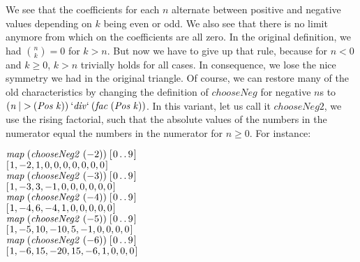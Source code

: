 \documentclass[tikz]{scrreprt}
\newcommand{\Conid}[1]{\mathit{#1}}
\newcommand{\Varid}[1]{\mathit{#1}}
\begin{document}
We see that the coefficients for each $n$
alternate between positive and negative values
depending on $k$ being even or odd.
We also see that there is no limit anymore
from which on the coefficients are all zero.
In the original definition,
we had $\binom{n}{k}=0$ for $k>n$.
But now we have to give up that rule,
because for $n<0$ and $k\ge 0$,
$k>n$ trivially holds for all cases.
In consequence, we lose the nice symmetry
we had in the original triangle.
Of course, we can restore many of the old
characteristics by changing the definition
of \ensuremath{\Varid{chooseNeg}} for negative $n$s to
\ensuremath{(\Varid{n}\mathbin{|>}(\Conid{Pos}\;\Varid{k}))\mathbin{\Varid{`div`}}(\Varid{fac}\;(\Conid{Pos}\;\Varid{k}))}.
In this variant, let us call it \ensuremath{\Varid{chooseNeg2}},
we use the rising factorial,
such that the absolute values of the numbers 
in the numerator equal the numbers in the numerator
for $n\ge 0$.
For instance:

\ensuremath{\Varid{map}\;(\Varid{chooseNeg2}\;(\mathbin{-}\mathrm{2}))\;[\mskip1.5mu \mathrm{0}\mathinner{\ldotp\ldotp}\mathrm{9}\mskip1.5mu]}\\
\ensuremath{[\mskip1.5mu \mathrm{1},\mathbin{-}\mathrm{2},\mathrm{1},\mathrm{0},\mathrm{0},\mathrm{0},\mathrm{0},\mathrm{0},\mathrm{0},\mathrm{0}\mskip1.5mu]}\\[12pt]
\ensuremath{\Varid{map}\;(\Varid{chooseNeg2}\;(\mathbin{-}\mathrm{3}))\;[\mskip1.5mu \mathrm{0}\mathinner{\ldotp\ldotp}\mathrm{9}\mskip1.5mu]}\\
\ensuremath{[\mskip1.5mu \mathrm{1},\mathbin{-}\mathrm{3},\mathrm{3},\mathbin{-}\mathrm{1},\mathrm{0},\mathrm{0},\mathrm{0},\mathrm{0},\mathrm{0},\mathrm{0}\mskip1.5mu]}\\[12pt]
\ensuremath{\Varid{map}\;(\Varid{chooseNeg2}\;(\mathbin{-}\mathrm{4}))\;[\mskip1.5mu \mathrm{0}\mathinner{\ldotp\ldotp}\mathrm{9}\mskip1.5mu]}\\
\ensuremath{[\mskip1.5mu \mathrm{1},\mathbin{-}\mathrm{4},\mathrm{6},\mathbin{-}\mathrm{4},\mathrm{1},\mathrm{0},\mathrm{0},\mathrm{0},\mathrm{0},\mathrm{0}\mskip1.5mu]}\\[12pt]
\ensuremath{\Varid{map}\;(\Varid{chooseNeg2}\;(\mathbin{-}\mathrm{5}))\;[\mskip1.5mu \mathrm{0}\mathinner{\ldotp\ldotp}\mathrm{9}\mskip1.5mu]}\\
\ensuremath{[\mskip1.5mu \mathrm{1},\mathbin{-}\mathrm{5},\mathrm{10},\mathbin{-}\mathrm{10},\mathrm{5},\mathbin{-}\mathrm{1},\mathrm{0},\mathrm{0},\mathrm{0},\mathrm{0}\mskip1.5mu]}\\[12pt]
\ensuremath{\Varid{map}\;(\Varid{chooseNeg2}\;(\mathbin{-}\mathrm{6}))\;[\mskip1.5mu \mathrm{0}\mathinner{\ldotp\ldotp}\mathrm{9}\mskip1.5mu]}\\
\ensuremath{[\mskip1.5mu \mathrm{1},\mathbin{-}\mathrm{6},\mathrm{15},\mathbin{-}\mathrm{20},\mathrm{15},\mathbin{-}\mathrm{6},\mathrm{1},\mathrm{0},\mathrm{0},\mathrm{0}\mskip1.5mu]}
\end{document}
